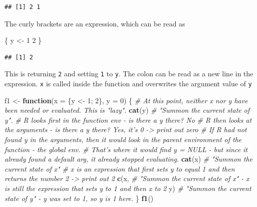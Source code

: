 \documentclass[]{book}
\newenvironment{Shaded}{\begin{snugshade}}{\end{snugshade}}
\newcommand{\CommentTok}[1]{\textcolor[rgb]{0.56,0.35,0.01}{\textit{#1}}}
\newcommand{\ControlFlowTok}[1]{\textcolor[rgb]{0.13,0.29,0.53}{\textbf{#1}}}
\newcommand{\DataTypeTok}[1]{\textcolor[rgb]{0.13,0.29,0.53}{#1}}
\newcommand{\DecValTok}[1]{\textcolor[rgb]{0.00,0.00,0.81}{#1}}
\newcommand{\KeywordTok}[1]{\textcolor[rgb]{0.13,0.29,0.53}{\textbf{#1}}}
\newcommand{\NormalTok}[1]{#1}
\newcommand{\StringTok}[1]{\textcolor[rgb]{0.31,0.60,0.02}{#1}}
\begin{document}
\begin{verbatim}
## [1] 2 1
\end{verbatim}

The curly brackets are an expression, which can be read as

\begin{Shaded}
\begin{Highlighting}[]
\NormalTok{\{}
\NormalTok{  y <-}\StringTok{ }\DecValTok{1}
  \DecValTok{2}
\NormalTok{\}}
\end{Highlighting}
\end{Shaded}

\begin{verbatim}
## [1] 2
\end{verbatim}

This is returning \texttt{2} and setting \texttt{1} to \texttt{y}. The colon can be read as a new line in the expression. \texttt{x} is called inside the function and overwrites the argument value of \texttt{y}

\begin{Shaded}
\begin{Highlighting}[]
\NormalTok{f1 <-}\StringTok{ }\ControlFlowTok{function}\NormalTok{(}\DataTypeTok{x =}\NormalTok{ \{y <-}\StringTok{ }\DecValTok{1}\NormalTok{; }\DecValTok{2}\NormalTok{\}, }\DataTypeTok{y =} \DecValTok{0}\NormalTok{) \{}
  \CommentTok{# At this point, neither x nor y have been needed or evaluated. This is "lazy".}
  \KeywordTok{cat}\NormalTok{(y) }
  \CommentTok{# "Summon the current state of y". }
  \CommentTok{# R looks first in the function env - is there a y there? No}
  \CommentTok{# R then looks at the arguments - is there a y there? Yes, it's 0 -> print out zero }
  \CommentTok{# If R had not found y in the arguments, then it would look in the parent environment of the function - the global env.}
  \CommentTok{# That's where it would find y = NULL - but since it already found a default arg, it already stopped evaluating. }
  \KeywordTok{cat}\NormalTok{(x)}
  \CommentTok{# "Summon the current state of x"}
  \CommentTok{# x is an expression that first sets y to equal 1 and then returns the number 2 -> print out 2}
  \KeywordTok{c}\NormalTok{(x, }\CommentTok{# "Summon the current state of x" - x is still the expression that sets y to 1 and then x to 2}
\NormalTok{    y) }\CommentTok{# "Summon the current state of y" - y was set to 1, so y is 1 here.}
\NormalTok{\}}
\KeywordTok{f1}\NormalTok{()}
\end{Highlighting}
\end{Shaded}
\end{document}
